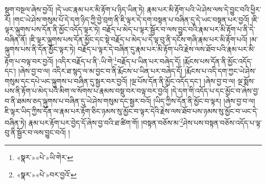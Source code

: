 སྡུག་བསྔལ་ཞེས་བྱའོ། །དེ་ཡང་རྣམ་པར་མི་རྟོག་པ་ཉིད་ཡིན་ཏེ། རྣམ་པར་མི་རྟོག་པའི་ཡེ་ཤེས་ལས་དེ་བྱུང་བའི་ཕྱིར་རོ། །གང་ཡེ་ཤེས་གསུམ་པོ་དེ་དག་ཉིད་ཀྱི་བྱེ་བྲག་ནི་ཇི་ལྟར་དེ་དག་བསྟན་པ་བཞིན་དུ་དེ་ཡང་བསྟན་པར་བྱའོ། །ཇི་ལྟར་ལྐུགས་པས་དོན་ནི་མྱོང་འདོད་ལྟར་ཏེ། བརྗོད་པ་མེད་པ་ལྟར་སྦྱོར་བ་ལས་བྱུང་བའི་རྣམ་པར་མི་རྟོག་པ་ནི་དེ་བཞིན་ནོ། །ཇི་ལྟར་ལྐུགས་པས་དོན་མྱོང་དང་སྟེ་བརྗོད་པ་མེད་པ་དེ་ལྟ་བུ་ནི་དངོས་གཞི་རྣམ་པར་མི་རྟོག་པའོ། །མ་ལྐུགས་པས་ནི་དོན་མྱོང་ལྟར་ཏེ། བརྗོད་པ་ལྟར་དེ་བཞིན་དུ་རྣམ་པར་མི་རྟོག་པའི་རྗེས་ལས་ཐོབ་པའི་རྣམ་པར་མི་རྟོག་པ་བལྟ་བར་བྱའོ། །འདིར་བརྗོད་པ་ནི་:ཡི་གེ་\footnote{«སྣར་»«པེ་»ཡི་གེར་}བརྗོད་པ་ཡིན་པར་བཞེད་དོ། །རྨོངས་པས་དོན་ནི་མྱོང་འདོད་དང་། །ཞེས་བྱ་བ་ལ། འདིར་ཐ་སྙད་ལ་མ་བྱང་བ་ནི་རྨོངས་པ་ཡིན་པར་བཞེད་དོ། །རྨོངས་པ་འདི་དག་ཀྱང་ཡེ་ཤེས་གསུམ་དང་དཔེ་ཡང་ལྐུགས་པ་བཞིན་དུ་སྦྱར་བར་བྱའོ། །ལྔ་པོས་དོན་ནི་མྱོང་འདོད་དང་། །ཞེས་བྱ་བ་ལ། ལྔ་སྨོས་པས་ནི་རྟོག་པ་མེད་པའི་མིག་ལ་སོགས་པ་རྣམས་བསྡུ་བར་བལྟ་བར་བྱའོ། །དེ་དག་གི་འདོད་པ་དང་མྱོང་བ་ཞེས་བྱ་བ་ནི་ཐམས་ཅད་ལྐུགས་པ་བཞིན་དུ་ཡེ་ཤེས་གསུམ་དང་སྦྱར་བའོ། །ཡིད་ཀྱིས་དོན་ནི་མྱོང་བ་ལྟར། །ཞེས་བྱ་བ་ལ། ཇི་ལྟར་ཡིད་ཀྱིས་དོན་ལ་རྣམ་པར་རྟོག་ཅིང་ཉམས་སུ་མྱོང་བ་ལྟར་དེའི་རྗེས་ལས་ཐོབ་པས་ཉམས་སུ་མྱོང་བ་ཡང་དེ་བཞིན་ཏེ། རྣམ་པར་རྟོག་པར་བྱེད་དོ་ཞེས་བྱ་བའི་ཐ་ཚིག་གོ། །བསྟན་བཅོས་མ་\footnote{«སྣར་»«པེ་»བར་བྱའོ་}ཤེས་པས་བསྟན་བཅོས་འདོད་པ་ལྟ་བུ་ནི་སྦྱོར་བ་ལས་བྱུང་བའོ། །
